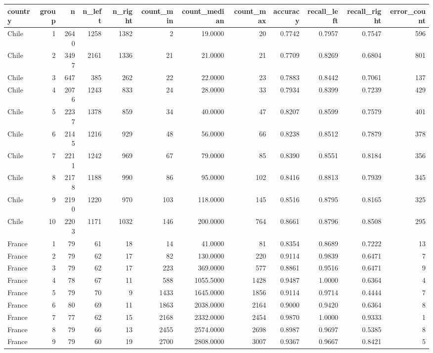 \begin{tabular}{lrrrrrrrrrrr}
\toprule
country & group & n & n_left & n_right & count_min & count_median & count_max & accuracy & recall_left & recall_right & error_count \\
\midrule
Chile & 1 & 2640 & 1258 & 1382 & 2 & 19.0000 & 20 & 0.7742 & 0.7957 & 0.7547 & 596 \\
Chile & 2 & 3497 & 2161 & 1336 & 21 & 21.0000 & 21 & 0.7709 & 0.8269 & 0.6804 & 801 \\
Chile & 3 & 647 & 385 & 262 & 22 & 22.0000 & 23 & 0.7883 & 0.8442 & 0.7061 & 137 \\
Chile & 4 & 2076 & 1243 & 833 & 24 & 28.0000 & 33 & 0.7934 & 0.8399 & 0.7239 & 429 \\
Chile & 5 & 2237 & 1378 & 859 & 34 & 40.0000 & 47 & 0.8207 & 0.8599 & 0.7579 & 401 \\
Chile & 6 & 2145 & 1216 & 929 & 48 & 56.0000 & 66 & 0.8238 & 0.8512 & 0.7879 & 378 \\
Chile & 7 & 2211 & 1242 & 969 & 67 & 79.0000 & 85 & 0.8390 & 0.8551 & 0.8184 & 356 \\
Chile & 8 & 2178 & 1188 & 990 & 86 & 95.0000 & 102 & 0.8416 & 0.8813 & 0.7939 & 345 \\
Chile & 9 & 2190 & 1220 & 970 & 103 & 118.0000 & 145 & 0.8516 & 0.8795 & 0.8165 & 325 \\
Chile & 10 & 2203 & 1171 & 1032 & 146 & 200.0000 & 764 & 0.8661 & 0.8796 & 0.8508 & 295 \\
France & 1 & 79 & 61 & 18 & 14 & 41.0000 & 81 & 0.8354 & 0.8689 & 0.7222 & 13 \\
France & 2 & 79 & 62 & 17 & 82 & 130.0000 & 220 & 0.9114 & 0.9839 & 0.6471 & 7 \\
France & 3 & 79 & 62 & 17 & 223 & 369.0000 & 577 & 0.8861 & 0.9516 & 0.6471 & 9 \\
France & 4 & 78 & 67 & 11 & 588 & 1055.5000 & 1428 & 0.9487 & 1.0000 & 0.6364 & 4 \\
France & 5 & 79 & 70 & 9 & 1433 & 1645.0000 & 1856 & 0.9114 & 0.9714 & 0.4444 & 7 \\
France & 6 & 80 & 69 & 11 & 1863 & 2038.0000 & 2164 & 0.9000 & 0.9420 & 0.6364 & 8 \\
France & 7 & 77 & 62 & 15 & 2168 & 2332.0000 & 2454 & 0.9870 & 1.0000 & 0.9333 & 1 \\
France & 8 & 79 & 66 & 13 & 2455 & 2574.0000 & 2698 & 0.8987 & 0.9697 & 0.5385 & 8 \\
France & 9 & 79 & 60 & 19 & 2700 & 2808.0000 & 3007 & 0.9367 & 0.9667 & 0.8421 & 5 \\

\end{tabular}
